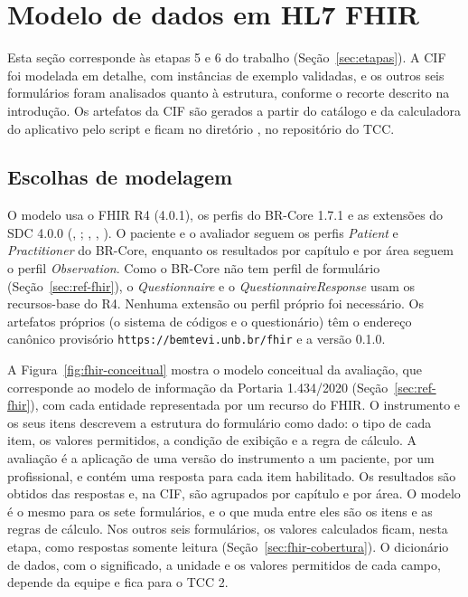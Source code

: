 \section{Modelo de dados em HL7 FHIR}
\label{sec:modelo-fhir}

Esta seção corresponde às etapas 5 e 6 do trabalho (Seção~\ref{sec:etapas}). A CIF foi modelada em detalhe, com
instâncias de exemplo validadas, e os outros seis formulários foram analisados quanto à estrutura, conforme o
recorte descrito na introdução. Os artefatos da CIF são gerados a partir do catálogo e da calculadora do aplicativo
pelo script  e ficam no diretório , no repositório
do TCC.

\subsection{Escolhas de modelagem}
\label{sec:fhir-escolhas}

O modelo usa o FHIR R4 (4.0.1), os perfis do BR-Core 1.7.1 e as extensões do SDC 4.0.0
(\citeauthor{brcore2026}, \citeyear{brcore2026}; \citeauthor{hl7fhirR4}, \citeyear{hl7fhirR4}, \citeyear{hl7sdc}). O paciente e o avaliador seguem os perfis \textit{Patient} e
\textit{Practitioner} do BR-Core, enquanto os resultados por capítulo e por área seguem o perfil \textit{Observation}.
Como o BR-Core não tem perfil de formulário (Seção~\ref{sec:ref-fhir}), o \textit{Questionnaire} e o
\textit{QuestionnaireResponse} usam os recursos-base do R4. Nenhuma extensão ou perfil próprio foi necessário. Os
artefatos próprios (o sistema de códigos e o questionário) têm o endereço canônico provisório
\texttt{https://bemtevi.unb.br/fhir} e a versão 0.1.0.

A Figura~\ref{fig:fhir-conceitual} mostra o modelo conceitual da avaliação, que corresponde ao modelo de informação
da Portaria 1.434/2020 (Seção~\ref{sec:ref-fhir}), com cada entidade representada por um recurso do FHIR. O
instrumento e os seus itens descrevem a estrutura do formulário como dado: o tipo de cada item, os valores
permitidos, a condição de exibição e a regra de cálculo. A avaliação é a aplicação de uma versão do instrumento a um
paciente, por um profissional, e contém uma resposta para cada item habilitado. Os resultados são obtidos das
respostas e, na CIF, são agrupados por capítulo e por área. O modelo é o mesmo para os sete formulários, e o que
muda entre eles são os itens e as regras de cálculo. Nos outros seis formulários, os valores calculados ficam, nesta
etapa, como respostas somente leitura (Seção~\ref{sec:fhir-cobertura}). O dicionário de dados, com o
significado, a unidade e os valores permitidos de cada campo, depende da equipe e fica para o TCC 2.

